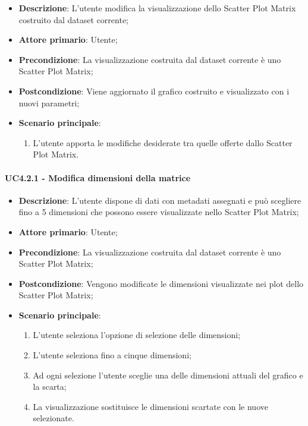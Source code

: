 \begin{itemize}
    \item \textbf{Descrizione}: L’utente modifica la visualizzazione dello Scatter Plot Matrix
                                costruito dal dataset corrente;

    \item \textbf{Attore primario}: Utente;

    \item \textbf{Precondizione}:   La visualizzazione costruita dal dataset corrente è uno Scatter Plot Matrix;

    \item \textbf{Postcondizione}:  Viene aggiornato il grafico costruito e visualizzato con i nuovi parametri;

	\item \textbf{Scenario principale}:
		\begin{enumerate}
            \item L'utente apporta le modifiche desiderate tra quelle offerte dallo Scatter Plot Matrix.
        \end{enumerate}
\end{itemize}


\paragraph{UC4.2.1 - Modifica dimensioni della matrice}
\label{par:uc4.2.1}
\begin{itemize}
    \item \textbf{Descrizione}:     L’utente dispone di dati con metadati assegnati e può
                                    scegliere fino a 5 dimensioni che possono essere visualizzate nello Scatter Plot
                                    Matrix;

    \item \textbf{Attore primario}: Utente;

    \item \textbf{Precondizione}:   La visualizzazione costruita dal dataset corrente è uno Scatter Plot Matrix;
    \item \textbf{Postcondizione}:  Vengono modificate le dimensioni visualizzate nei plot dello Scatter Plot Matrix;

	\item \textbf{Scenario principale}:
        \begin{enumerate}
            \item   L'utente seleziona l'opzione di selezione delle dimensioni;
            \item   L'utente seleziona fino a cinque dimensioni;

            \item   Ad ogni selezione l'utente
                    sceglie una delle dimensioni attuali del grafico e la scarta;

            \item   La visualizzazione sostituisce le dimensioni scartate con le nuove selezionate.
        \end{enumerate}
\end{itemize}

